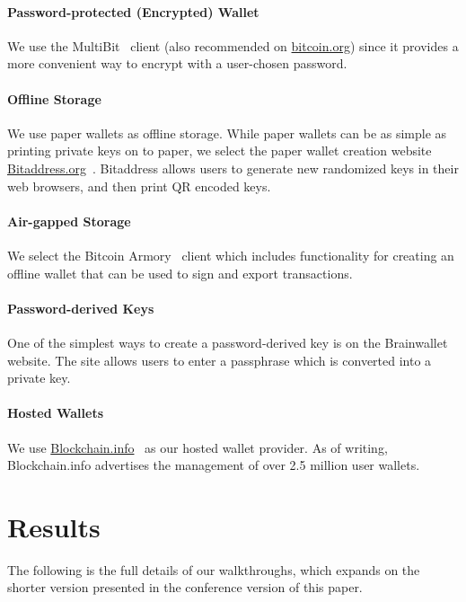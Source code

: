 \paragraph{Password-protected (Encrypted) Wallet} We use the MultiBit~\cite{multibit} client (also recommended on \url{bitcoin.org}) since it provides a more convenient way to encrypt with a user-chosen password.

\paragraph{Offline Storage} We use paper wallets as offline storage. While paper wallets can be as simple as printing private keys on to paper, we select the paper wallet creation website \url{Bitaddress.org}~\cite{bitaddress}. Bitaddress allows users to generate new randomized keys in their web browsers, and then print QR encoded keys. 

\paragraph{Air-gapped Storage} We select the Bitcoin Armory~\cite{bitcoinarmory} client which includes functionality for creating an offline wallet that can be used to sign and export transactions. 

\paragraph{Password-derived Keys} One of the simplest ways to create a password-derived key is on the Brainwallet~\cite{brainwallet} website. The site allows users to enter a passphrase which is converted into a private key. 

\paragraph{Hosted Wallets} We use \url{Blockchain.info}~\cite{blockchain} as our hosted wallet provider. As of writing, Blockchain.info advertises the management of over 2.5 million user wallets.


\section{Results}

The following is the full details of our walkthroughs, which expands on the shorter version presented in the conference version of this paper.

